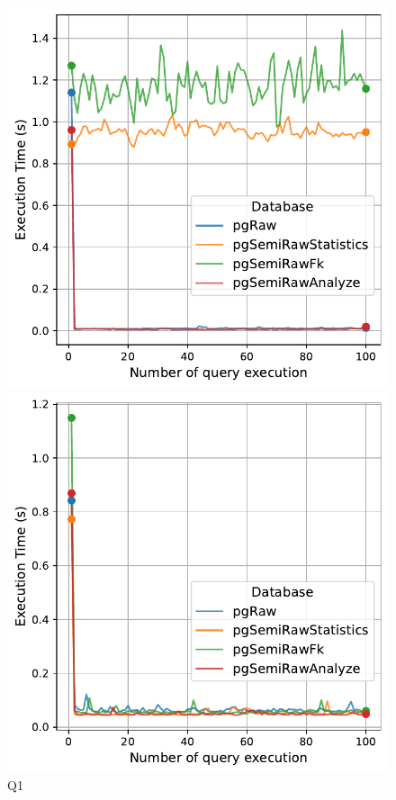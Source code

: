 \begin{figure}[h!]
\centering
\begin{minipage}[b]{0.45\linewidth}
    \centering
    \includegraphics[width=1.0\linewidth]{charts-eval-exp-time-stat/execution_time_db_type_Q1.pdf}
    \caption*{Q1}
\end{minipage}
\hfill
\begin{minipage}[b]{0.45\linewidth}
    \centering
    \includegraphics[width=1.0\linewidth]{charts-eval-exp-time-stat/execution_time_db_type_Q2.pdf}

\end{minipage}
\end{figure}
